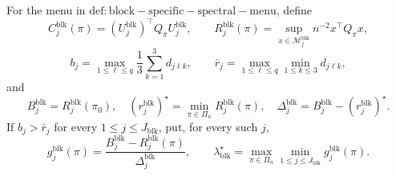 For the menu in \(\mathrm{def:block-specific-spectral-menu}\), define
\[
C_j^{\mathrm{blk}}(\pi)
=(U_j^{\mathrm{blk}})^\top Q_\pi U_j^{\mathrm{blk}},
\qquad
R_j^{\mathrm{blk}}(\pi)
=\sup_{x\in\mathcal M_j^{\mathrm{blk}}}n^{-2}x^\top Q_\pi x,
\]
\[
b_j=\max_{1\le\ell\le q}\frac13\sum_{k=1}^3d_{j\ell k},
\qquad
\bar r_j=\max_{1\le\ell\le q}\min_{1\le k\le3}d_{j\ell k},
\]
and
\[
B_j^{\mathrm{blk}}=R_j^{\mathrm{blk}}(\pi_0),
\quad
(r_j^{\mathrm{blk}})^\star=\min_{\pi\in\Pi_n}R_j^{\mathrm{blk}}(\pi),
\quad
\Delta_j^{\mathrm{blk}}=B_j^{\mathrm{blk}}-(r_j^{\mathrm{blk}})^\star.
\]
If \(b_j>\bar r_j\) for every \(1\le j\le J_{\mathrm{blk}}\), put, for every such \(j\),
\[
g_j^{\mathrm{blk}}(\pi)
=\frac{B_j^{\mathrm{blk}}-R_j^{\mathrm{blk}}(\pi)}{\Delta_j^{\mathrm{blk}}},
\qquad
\lambda_{\mathrm{blk}}^\star
=\max_{\pi\in\Pi_n}\min_{1\le j\le J_{\mathrm{blk}}}g_j^{\mathrm{blk}}(\pi).
\]
